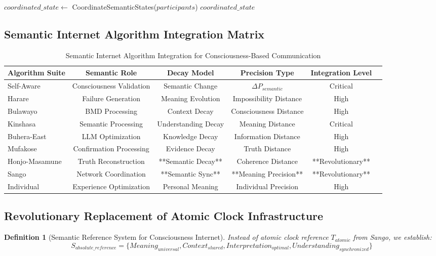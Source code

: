 \documentclass[12pt,a4paper]{article}
\newtheorem{definition}[theorem]{Definition}
\begin{document}
\begin{algorithm}
\begin{algorithmic}[1]
\begin{algorithm}
\begin{algorithmic}[1]
    \State $coordinated\_state \leftarrow$ CoordinateSemanticStates($participants$)
    \State \Return $coordinated\_state$
\EndProcedure
\end{algorithmic}
\end{algorithm}

\subsection{Semantic Internet Algorithm Integration Matrix}

\begin{table}[htbp]
\centering
\caption{Semantic Internet Algorithm Integration for Consciousness-Based Communication}
\begin{tabular}{@{}lccccc@{}}
\toprule
\textbf{Algorithm Suite} & \textbf{Semantic Role} & \textbf{Decay Model} & \textbf{Precision Type} & \textbf{Integration Level} \\
\midrule
Self-Aware & Consciousness Validation & Semantic Change & $\Delta P_{semantic}$ & Critical \\
Harare & Failure Generation & Meaning Evolution & Impossibility Distance & High \\
Bulawayo & BMD Processing & Context Decay & Consciousness Distance & High \\
Kinshasa & Semantic Processing & Understanding Decay & Meaning Distance & Critical \\
Buhera-East & LLM Optimization & Knowledge Decay & Information Distance & High \\
Mufakose & Confirmation Processing & Evidence Decay & Truth Distance & High \\
Honjo-Masamune & Truth Reconstruction & **Semantic Decay** & Coherence Distance & **Revolutionary** \\
Sango & Network Coordination & **Semantic Sync** & **Meaning Precision** & **Revolutionary** \\
Individual & Experience Optimization & Personal Meaning & Individual Precision & High \\
\bottomrule
\end{tabular}
\end{table}

\subsection{Revolutionary Replacement of Atomic Clock Infrastructure}

\begin{definition}[Semantic Reference System for Consciousness Internet]
Instead of atomic clock reference $T_{atomic}$ from Sango, we establish:
$$S_{absolute\_reference} = \{Meaning_{universal}, Context_{shared}, Interpretation_{optimal}, Understanding_{synchronized}\}$$


\end{definition}
\end{algorithmic}
\end{algorithm}
\end{document}
